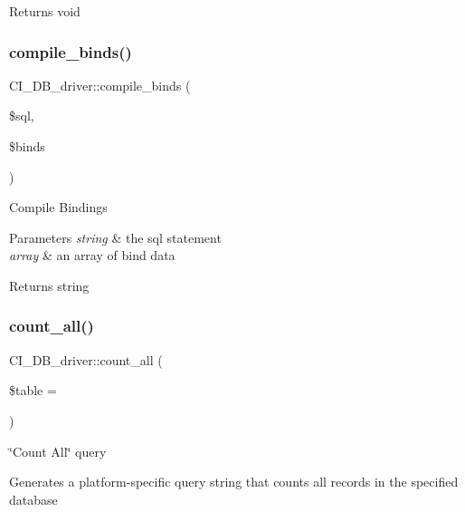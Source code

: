 \begin{DoxyReturn}{Returns}
void 
\end{DoxyReturn}
\mbox{\label{class_c_i___d_b__driver_ac2aa53409ab8dba19b086243a6dd754e}} 
\subsubsection{\texorpdfstring{compile\+\_\+binds()}{compile\_binds()}}
{\footnotesize\ttfamily C\+I\+\_\+\+D\+B\+\_\+driver\+::compile\+\_\+binds (\begin{DoxyParamCaption}\item[{}]{\$sql,  }\item[{}]{\$binds }\end{DoxyParamCaption})}

Compile Bindings


\begin{DoxyParams}{Parameters}
{\em string} & the sql statement \\
\hline
{\em array} & an array of bind data \\
\hline
\end{DoxyParams}
\begin{DoxyReturn}{Returns}
string 
\end{DoxyReturn}
\mbox{\label{class_c_i___d_b__driver_af2d699120ac561ba96d22224229114d1}} 
\subsubsection{\texorpdfstring{count\+\_\+all()}{count\_all()}}
{\footnotesize\ttfamily C\+I\+\_\+\+D\+B\+\_\+driver\+::count\+\_\+all (\begin{DoxyParamCaption}\item[{}]{\$table = {\ttfamily \textquotesingle{}\textquotesingle{}} }\end{DoxyParamCaption})}

\char`\"{}\+Count All\char`\"{} query

Generates a platform-\/specific query string that counts all records in the specified database


